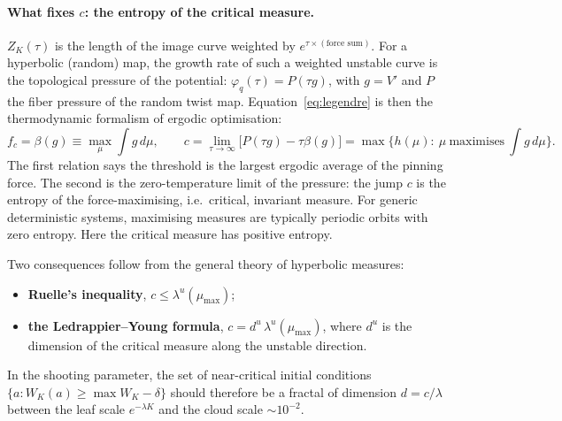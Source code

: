 \documentclass[10pt,a4paper]{article}
\begin{document}
\paragraph{What fixes $c$: the entropy of the critical measure.}
$Z_K(\tau)$ is the length of the image curve weighted by $e^{\tau\times(\text{force sum})}$.
For a hyperbolic (random) map, the growth rate of such a weighted unstable curve is the topological pressure of the potential: $\varphi_q(\tau)=P(\tau g)$, with $g=V'$ and $P$ the fiber pressure of the random twist map.
Equation~\eqref{eq:legendre} is then the thermodynamic formalism of ergodic optimisation:
\begin{equation}
f_c=\beta(g)\equiv\max_{\mu}\int g\,d\mu,\qquad
c=\lim_{\tau\to\infty}\big[P(\tau g)-\tau\beta(g)\big]=\max\{h(\mu):\ \mu\ \text{maximises}\ \textstyle\int g\,d\mu\}.
\label{eq:residual}
\end{equation}
The first relation says the threshold is the largest ergodic average of the pinning force.
The second is the zero-temperature limit of the pressure: the jump $c$ is the entropy of the force-maximising, i.e.\ critical, invariant measure.
For generic deterministic systems, maximising measures are typically periodic orbits with zero entropy. Here the critical measure has positive entropy.

Two consequences follow from the general theory of hyperbolic measures:
\begin{itemize}
\item \textbf{Ruelle's inequality}, $c\le\lambda^u(\mu_{\max})$;
\item \textbf{the Ledrappier--Young formula}, $c=d^u\,\lambda^u(\mu_{\max})$, where $d^u$ is the dimension of the critical measure along the unstable direction.
\end{itemize}
In the shooting parameter, the set of near-critical initial conditions $\{a:W_K(a)\ge\max W_K-\delta\}$ should therefore be a fractal of dimension $d=c/\lambda$ between the leaf scale $e^{-\lambda K}$ and the cloud scale $\sim10^{-2}$.
\end{document}
